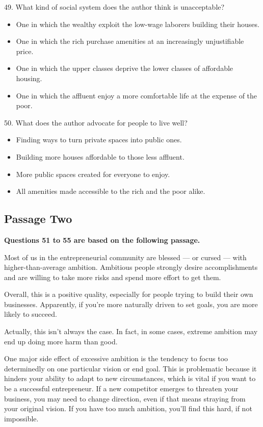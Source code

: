 \documentclass[UTF8,11pt]{ctexart}
\begin{document}
49. What kind of social system does the author think is unacceptable?


\begin{itemize}[leftmargin=2em,itemsep=.2em,topsep=.4em]\item[A.] One in which the wealthy exploit the low-wage laborers building their houses.
\item[B.] One in which the rich purchase amenities at an increasingly unjustifiable price.
\item[C.] One in which the upper classes deprive the lower classes of affordable housing.
\item[D.] One in which the affluent enjoy a more comfortable life at the expense of the poor.
\end{itemize}

50. What does the author advocate for people to live well?


\begin{itemize}[leftmargin=2em,itemsep=.2em,topsep=.4em]\item[A.] Finding ways to turn private spaces into public ones.
\item[B.] Building more houses affordable to those less affluent.
\item[C.] More public spaces created for everyone to enjoy.
\item[D.] All amenities made accessible to the rich and the poor alike.
\end{itemize}

\subsection*{\textbf{Passage Two}}


\textbf{Questions 51 to 55 are based on the following passage.}


Most of us in the entrepreneurial community are blessed — or cursed — with higher-than-average ambition. Ambitious people strongly desire accomplishments and are willing to take more risks and spend more effort to get them.


Overall, this is a positive quality, especially for people trying to build their own businesses. Apparently, if you’re more naturally driven to set goals, you are more likely to succeed.


Actually, this isn’t always the case. In fact, in some cases, extreme ambition may end up doing more harm than good.


One major side effect of excessive ambition is the tendency to focus too determinedly on one particular vision or end goal. This is problematic because it hinders your ability to adapt to new circumstances, which is vital if you want to be a successful entrepreneur. If a new competitor emerges to threaten your business, you may need to change direction, even if that means straying from your original vision. If you have too much ambition, you’ll find this hard, if not impossible.
\end{document}
